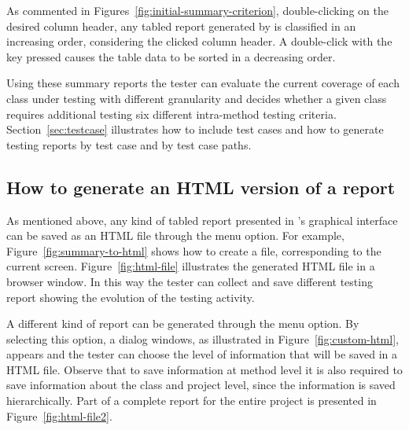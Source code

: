 As commented in Figures~\ref{fig:initial-summary-criterion},
double-clicking on the desired column header, any tabled report
generated by \toolname is classified in an increasing order,
considering the clicked column header. A double-click with the
 key pressed causes the table data to be sorted in a
decreasing order.

Using these summary reports the tester can evaluate the current
coverage of each class under testing with different granularity
and decides whether a given class requires additional testing \wrt
six different intra-method testing criteria.
Section~\ref{sec:testcase} illustrates how to include test cases
and how to generate testing reports by test case and by test case
paths.





\afterpage{\clearpage}
\newpage

\subsection{How to generate an HTML version of a \toolname
report}

As mentioned above, any kind of tabled report presented in
\toolname's graphical interface can be saved as an HTML file
through the  menu
option. For example, Figure~\ref{fig:summary-to-html} shows how to
create a  file, corresponding to the
current \toolname screen. Figure~\ref{fig:html-file} illustrates
the generated HTML file in a browser window. In this way the
tester can collect and save different testing report showing the
evolution of the testing activity.



A different kind of report can be generated through the
 menu option. By selecting
this option, a dialog windows, as illustrated in
Figure~\ref{fig:custom-html}, appears and the tester can choose
the level of information that will be saved in a HTML file.
Observe that to save information at method level it is also
required to save information about the class and project level,
since the information is saved hierarchically. Part of a complete
report for the entire project is presented in
Figure~\ref{fig:html-file2}.



\afterpage{\clearpage}
\newpage

